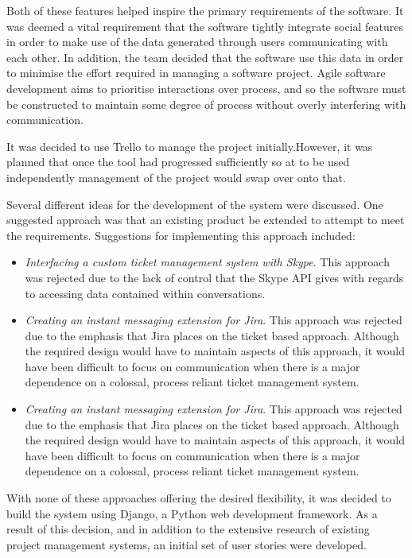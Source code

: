 \documentclass[a4paper]{l3proj}
\begin{document}
Both of these features helped inspire the primary requirements of the software. It was deemed a vital requirement that the software tightly integrate social features in order to make use of the data generated through users communicating with each other. In addition, the team decided that the software use this data in order to minimise the effort required in managing a software project. Agile software development aims to prioritise interactions over process, and so the software must be constructed to maintain some degree of process without overly interfering with communication.

It was decided to use Trello to manage the project initially.However, it was planned that once the tool had progressed sufficiently so at to be used independently management of the project would swap over onto that.

Several different ideas for the development of the system were discussed. One suggested approach was that an existing product be extended to attempt to meet the requirements. Suggestions for implementing this approach included:

\begin{itemize}
  \item \textit{Interfacing a custom ticket management system with Skype}. This approach was rejected due to the lack of control that the Skype API gives with regards to accessing data contained within conversations.
  \item \textit{Creating an instant messaging extension for Jira}. This approach was rejected due to the emphasis that Jira places on the ticket based approach. Although the required design would have to maintain aspects of this approach, it would have been difficult to focus on communication when there is a major dependence on a colossal, process reliant ticket management system.

  \item \textit{Creating an instant messaging extension for Jira}. This approach was rejected due to the emphasis that Jira places on the ticket based approach. Although the required design would have to maintain aspects of this approach, it would have been difficult to focus on communication when there is a major dependence on a colossal, process reliant ticket management system.

\end{itemize}

With none of these approaches offering the desired flexibility, it was decided to build the system using Django, a Python web development framework.  As a result of this decision, and in addition to the extensive research of existing project management systems, an initial set of user stories were developed.
\end{document}
